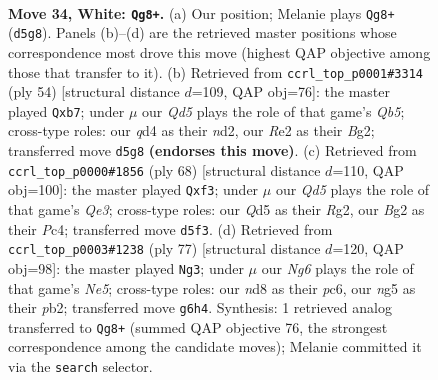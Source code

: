 \documentclass[11pt]{article}
\begin{document}
\clearpage

\begin{figure}[p]\centering
\begin{subfigure}{0.46\textwidth}\centering
\resizebox{\linewidth}{!}{%
\newchessgame
\chessboard[
  setfen={r2nk3/1p4p1/p4pN1/3Q2np/3q4/4P1P1/PP2RPBP/3R2K1 w - - 4 34},
  showmover=false,
  pgfstyle=straightmove, color=movearrow, markmove={d5-g8}
]}
\caption{}
\end{subfigure}\hfill
\begin{subfigure}{0.46\textwidth}\centering
\resizebox{\linewidth}{!}{%
\newchessgame
\chessboard[
  setfen={r5k1/1p3pp1/4p2p/pQ2P3/Pq1r4/2R3P1/1P1n1PBP/3R2K1 w - - 3 28},
  showmover=false,
  pgfstyle=straightmove, color=movearrow, markmove={b5-b7}
]}
\caption{}
\end{subfigure}
\\[4pt]
\begin{subfigure}{0.46\textwidth}\centering
\resizebox{\linewidth}{!}{%
\newchessgame
\chessboard[
  setfen={1r4k1/5pp1/3p3p/3Pn3/2P1p3/1P2QqPP/5PR1/3RK3 w - - 1 35},
  showmover=false,
  pgfstyle=straightmove, color=movearrow, markmove={e3-f3}
]}
\caption{}
\end{subfigure}\hfill
\begin{subfigure}{0.46\textwidth}\centering
\resizebox{\linewidth}{!}{%
\newchessgame
\chessboard[
  setfen={r5k1/5p1p/pQPb2p1/Ppqp4/4n3/7P/1P1NRPP1/5BK1 b - - 7 39},
  showmover=false,
  pgfstyle=straightmove, color=movearrow, markmove={e4-g3}
]}
\caption{}
\end{subfigure}
\caption{\textbf{Move 34, White: \texttt{Qg8+}.} (a) Our position; Melanie plays \texttt{Qg8+} (\texttt{d5g8}). Panels (b)--(d) are the retrieved master positions whose correspondence most drove this move (highest QAP objective among those that transfer to it). (b) Retrieved from \texttt{ccrl\_top\_p0001\#3314} (ply 54) [structural distance $d$=109, QAP obj=76]: the master played \texttt{Qxb7}; under $\mu$ our \emph{Qd5} plays the role of that game's \emph{Qb5}; cross-type roles: our \emph{q}d4 as their \emph{n}d2, our \emph{R}e2 as their \emph{B}g2; transferred move \texttt{d5g8} \textbf{(endorses this move)}. (c) Retrieved from \texttt{ccrl\_top\_p0000\#1856} (ply 68) [structural distance $d$=110, QAP obj=100]: the master played \texttt{Qxf3}; under $\mu$ our \emph{Qd5} plays the role of that game's \emph{Qe3}; cross-type roles: our \emph{Q}d5 as their \emph{R}g2, our \emph{B}g2 as their \emph{P}c4; transferred move \texttt{d5f3}. (d) Retrieved from \texttt{ccrl\_top\_p0003\#1238} (ply 77) [structural distance $d$=120, QAP obj=98]: the master played \texttt{Ng3}; under $\mu$ our \emph{Ng6} plays the role of that game's \emph{Ne5}; cross-type roles: our \emph{n}d8 as their \emph{p}c6, our \emph{n}g5 as their \emph{p}b2; transferred move \texttt{g6h4}. Synthesis: 1 retrieved analog transferred to \texttt{Qg8+} (summed QAP objective 76, the strongest correspondence among the candidate moves); Melanie committed it via the \texttt{search} selector.}
\label{fig:thought-m66}
\end{figure}
\end{document}
